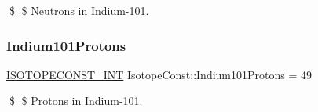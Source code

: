 \$ \$ Neutrons in Indium-\/101. \mbox{\label{group___isotope_const-_indium-_in101_ga0ed8876ea37cb1ca41767abc8a82e975}} 
\subsubsection{\texorpdfstring{Indium101\+Protons}{Indium101Protons}}
{\footnotesize\ttfamily \mbox{\hyperlink{group___isotope_const-_macros_ga5f18360b3e99483a35c32d789e62621c}{I\+S\+O\+T\+O\+P\+E\+C\+O\+N\+S\+T\+\_\+\+I\+NT}} Isotope\+Const\+::\+Indium101\+Protons = 49}

\$ \$ Protons in Indium-\/101. 